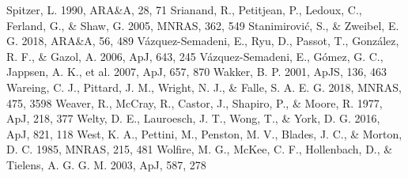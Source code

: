 \documentclass[modern]{aastex63}
\begin{document}
\begin{references}
 Spitzer, L. 1990, ARA\&A, 28, 71
 Srianand, R., Petitjean, P., Ledoux, C., Ferland, G., \& Shaw, G. 2005, MNRAS, 
362, 549
 Stanimirović, S., \& Zweibel, E. G. 2018, ARA\&A, 56, 489
 Vázquez-Semadeni, E., Ryu, D., Passot, T., González, R. F., \& Gazol, A. 2006, 
ApJ, 643, 245
 Vázquez-Semadeni, E., Gómez, G. C., Jappsen, A. K., et al. 2007, ApJ, 657, 870
 Wakker, B. P. 2001, ApJS, 136, 463
 Wareing, C. J., Pittard, J. M., Wright, N. J., \& Falle, S. A. E. G. 2018, MNRAS, 
475, 3598
 Weaver, R., McCray, R., Castor, J., Shapiro, P., \& Moore, R. 1977, ApJ, 218, 
377
 Welty, D. E., Lauroesch, J. T., Wong, T., \& York, D. G. 2016, ApJ, 821, 118
 West, K. A., Pettini, M., Penston, M. V., Blades, J. C., \& Morton, D. C. 1985, 
MNRAS, 215, 481
 Wolfire, M. G., McKee, C. F., Hollenbach, D., \& Tielens, A. G. G. M. 2003, ApJ, 
587, 278
\end{references}
\end{document}
